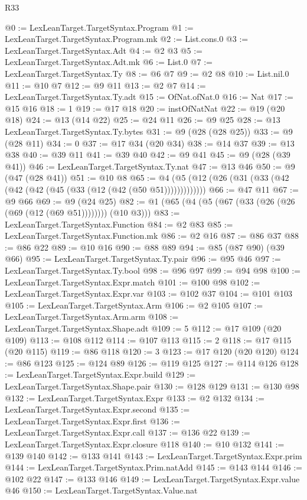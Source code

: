 \begin{lexlean}{R33}
\begin{coremodule}
@0 := LexLeanTarget.TargetSyntax.Program
@1 := LexLeanTarget.TargetSyntax.Program.mk
@2 := List.cons.{0}
@3 := LexLeanTarget.TargetSyntax.Adt
@4 := @2 @3
@5 := LexLeanTarget.TargetSyntax.Adt.mk
@6 := List.{0}
@7 := LexLeanTarget.TargetSyntax.Ty
@8 := @6 @7
@9 := @2 @8
@10 := List.nil.{0}
@11 := @10 @7
@12 := @9 @11
@13 := @2 @7
@14 := LexLeanTarget.TargetSyntax.Ty.adt
@15 := OfNat.ofNat.{0}
@16 := Nat
@17 := @15 @16
@18 := 1
@19 := @17 @18
@20 := instOfNatNat
@22 := @19 (@20 @18)
@24 := @13 (@14 @22)
@25 := @24 @11
@26 := @9 @25
@28 := @13 LexLeanTarget.TargetSyntax.Ty.bytes
@31 := @9 (@28 (@28 @25))
@33 := @9 (@28 @11)
@34 := 0
@37 := @17 @34 (@20 @34)
@38 := @14 @37
@39 := @13 @38
@40 := @39 @11
@41 := @39 @40
@42 := @9 @41
@45 := @9 (@28 (@39 @41))
@46 := LexLeanTarget.TargetSyntax.Ty.nat
@47 := @13 @46
@50 := @9 (@47 (@28 @41))
@51 := @10 @8
@65 := @4 (@5 (@12 (@26 (@31 (@33 (@42 (@42 (@42 (@45 (@33 (@12 (@42 (@50 @51)))))))))))))
@66 := @47 @11
@67 := @9 @66
@69 := @9 (@24 @25)
@82 := @1 (@65 (@4 (@5 (@67 (@33 (@26 (@26 (@69 (@12 (@69 @51)))))))) (@10 @3)))
@83 := LexLeanTarget.TargetSyntax.Function
@84 := @2 @83
@85 := LexLeanTarget.TargetSyntax.Function.mk
@86 := @2 @16
@87 := @86 @37
@88 := @86 @22
@89 := @10 @16
@90 := @88 @89
@94 := @85 (@87 @90) (@39 @66)
@95 := LexLeanTarget.TargetSyntax.Ty.pair
@96 := @95 @46
@97 := LexLeanTarget.TargetSyntax.Ty.bool
@98 := @96 @97
@99 := @94 @98
@100 := LexLeanTarget.TargetSyntax.Expr.match
@101 := @100 @98
@102 := LexLeanTarget.TargetSyntax.Expr.var
@103 := @102 @37
@104 := @101 @103
@105 := LexLeanTarget.TargetSyntax.Arm
@106 := @2 @105
@107 := LexLeanTarget.TargetSyntax.Arm.arm
@108 := LexLeanTarget.TargetSyntax.Shape.adt
@109 := 5
@112 := @17 @109 (@20 @109)
@113 := @108 @112
@114 := @107 @113
@115 := 2
@118 := @17 @115 (@20 @115)
@119 := @86 @118
@120 := 3
@123 := @17 @120 (@20 @120)
@124 := @86 @123
@125 := @124 @89
@126 := @119 @125
@127 := @114 @126
@128 := LexLeanTarget.TargetSyntax.Expr.build
@129 := LexLeanTarget.TargetSyntax.Shape.pair
@130 := @128 @129
@131 := @130 @98
@132 := LexLeanTarget.TargetSyntax.Expr
@133 := @2 @132
@134 := LexLeanTarget.TargetSyntax.Expr.second
@135 := LexLeanTarget.TargetSyntax.Expr.first
@136 := LexLeanTarget.TargetSyntax.Expr.call
@137 := @136 @22
@139 := LexLeanTarget.TargetSyntax.Expr.closure @118
@140 := @10 @132
@141 := @139 @140
@142 := @133 @141
@143 := LexLeanTarget.TargetSyntax.Expr.prim
@144 := LexLeanTarget.TargetSyntax.Prim.natAdd
@145 := @143 @144
@146 := @102 @22
@147 := @133 @146
@149 := LexLeanTarget.TargetSyntax.Expr.value @46
@150 := LexLeanTarget.TargetSyntax.Value.nat

\end{coremodule}
\end{lexlean}
